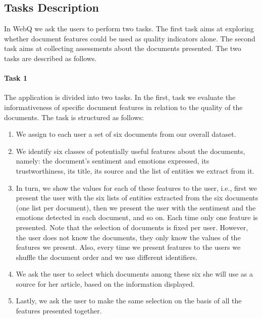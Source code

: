 \documentclass{llncs}
\begin{document}
\subsection{Tasks Description}
In WebQ we ask the users to perform two tasks. The first task aims at exploring whether document features could be used as quality indicators alone. The second task aims at collecting assessments about the documents presented. The two tasks are described as follows.


\paragraph{Task 1}
The application is divided into two tasks. In the first, task we evaluate the informativeness of specific document features in relation to the quality of the documents.
The task is structured as follows:
\begin{enumerate}
\item We assign to each user a set of six documents from our overall dataset.
\item We identify six classes of potentially useful features about the documents, namely: the document's sentiment and emotions expressed, its trustworthiness, its title, its source and the list of entities we extract from it.
\item In turn, we show the values for each of these features to the user, i.e., first we present the user with the six lists of entities extracted from the six documents (one list per document), then we present the user with the sentiment and the emotions detected in each document, and so on. Each time only one feature is presented. Note that the selection of documents is fixed per user. However, the user does not know the documents, they only know the values of the features we present. Also, every time we present features to the users we shuffle the document order and we use different identifiers.
\item We ask the user to select which documents among these six she will use as a source for her article, based on the information displayed.
\item Lastly, we ask the user to make the same selection on the basis of all the features presented together.
\end{enumerate}
\end{document}
